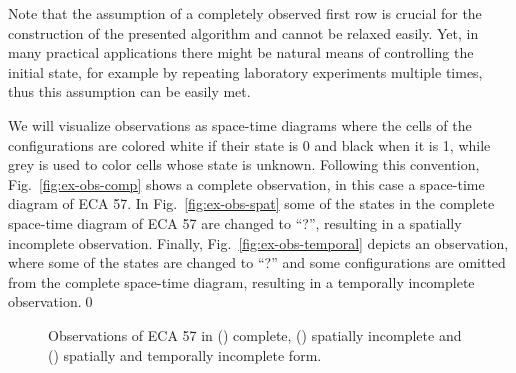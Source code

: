 Note that the assumption of a completely observed first row is crucial for the construction of the presented algorithm and cannot be relaxed easily. Yet, in many practical applications there might be natural means of controlling the initial state, for example by repeating laboratory experiments multiple times, thus this assumption can be easily met.

\begin{example}
	We will visualize observations as space-time diagrams where the cells of the configurations are colored white if their state is 0 and black when it is 1, while grey is used to color cells whose state is unknown. Following this convention, Fig.~\ref{fig:ex-obs-comp} shows a complete observation, in this case a space-time diagram of ECA 57. In Fig.~\ref{fig:ex-obs-spat} some of the states in the complete space-time diagram of ECA 57 are changed to ``?'', resulting in a spatially incomplete observation. Finally, Fig.~\ref{fig:ex-obs-temporal} depicts an observation, where some of the states are changed to ``?'' and some configurations are omitted from the complete space-time diagram, resulting in a temporally incomplete observation.\qed%
	\begin{figure}
		\centering
		\quad
		\quad
		\caption{Observations of ECA 57 in (\protect{}) complete, (\protect{}) spatially incomplete and (\protect{}) spatially and temporally incomplete form.}\label{fig:ex-obs}
	\end{figure}
\end{example}

